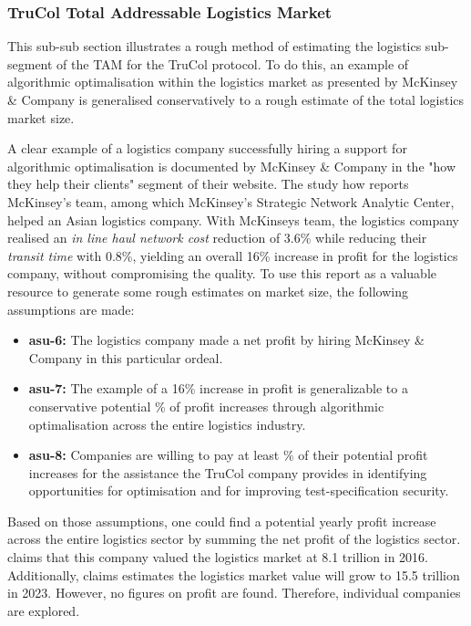 \subsubsection{TruCol Total Addressable Logistics Market}\label{subsubsec:tam_logistics}

This sub-sub section illustrates a rough method of estimating the logistics sub-segment of the TAM for the TruCol protocol. To do this, an example of algorithmic optimalisation within the logistics market as presented by McKinsey \& Company is generalised conservatively to a rough estimate of the total logistics market size.

A clear example of a logistics company successfully hiring a support for algorithmic optimalisation is documented by McKinsey \& Company in the "how they help their clients" segment of their website\cite{mckinsey_algo}. The study how reports McKinsey's team, among which McKinsey's Strategic Network Analytic Center, helped an Asian logistics company. With McKinseys team, the logistics company realised an \textit{in line haul network cost} reduction of 3.6\% while reducing their \textit{transit time} with 0.8\%, yielding an overall 16\% increase in profit for the logistics company, without compromising the quality. To use this report as a valuable resource to generate some rough estimates on market size, the following assumptions are made:

 \begin{itemize}
 	\item \textbf{asu-6:} The logistics company made a net profit by hiring McKinsey \& Company in this particular ordeal.
	\item \textbf{asu-7:} The example of a 16\% increase in profit is generalizable to a conservative potential \textbf{\avgalgooptimisationprofitpercentage}\% of profit increases through algorithmic optimalisation across the entire logistics industry.
	\item \textbf{asu-8:} Companies are willing to pay at least \textbf{\TruColcutonprofitpercentage} \% of their potential profit increases for the assistance the TruCol company provides in identifying opportunities for optimisation and for improving test-specification security.
\end{itemize}

\noindent Based on those assumptions, one could find a potential yearly profit increase across the entire logistics sector by summing the net profit of the logistics sector. \cite{cips} claims that this company \cite{transparency_market_research} valued the logistics market at 8.1 trillion in 2016. Additionally, \cite{cips} claims \cite{transparency_market_research} estimates the logistics market value will grow to 15.5 trillion in 2023. However, no figures on profit are found. Therefore, individual companies are explored.

